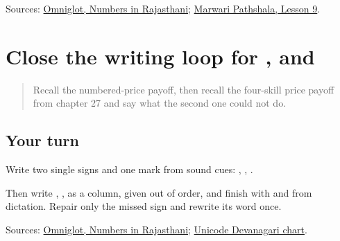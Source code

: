 \begin{tcolorbox}[breakable,colback=teal!4,colframe=teal!35!black,title={Before you move on}]
Sources: \href{https://www.omniglot.com/language/numbers/rajasthani.htm}{Omniglot, Numbers in Rajasthani}; \href{https://www.marwaripathshala.com/marwari-lesson-9-english}{Marwari Pathshala, Lesson 9}.
\end{tcolorbox}
\section[Practice]{Close the writing loop for ,  and }

\label{lesson:MW-R34-script-close}



\begin{quote}
Recall the numbered-price payoff, then recall the four-skill price payoff from chapter 27 and say what the second one could not do.
\end{quote}

\subsection*{Your turn}
Write two single signs and one mark from sound cues: \textbf{}, \textbf{}, \textbf{}.

Then write \textbf{}, \textbf{}, \textbf{} as a column, given out of order, and finish with \textbf{} and \textbf{ } from dictation. Repair only the missed sign and rewrite its word once.

\begin{tcolorbox}[breakable,colback=teal!4,colframe=teal!35!black,title={Before you move on}]
Sources: \href{https://www.omniglot.com/language/numbers/rajasthani.htm}{Omniglot, Numbers in Rajasthani}; \href{https://www.unicode.org/charts/PDF/U0900.pdf}{Unicode Devanagari chart}.
\end{tcolorbox}
